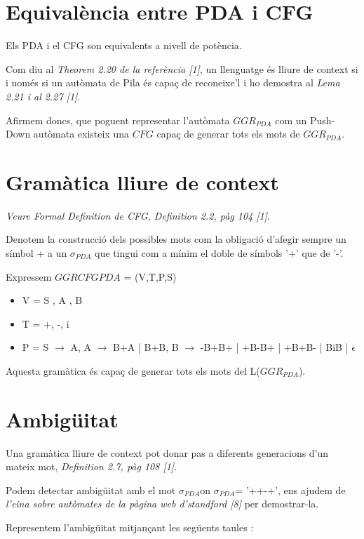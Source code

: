 \documentclass[12pt,a4paper]{report}
\def \wpda{$\sigma_{PDA} $}
\def \pdaCFG{$GGRCFG{PDA} $}
\def \pda{$GGR_{PDA} $}
\begin{document}
\section{Equivalència entre PDA i CFG}

Els PDA i el CFG son equivalents a nivell de potència. 

Com diu al \textit{Theorem 2.20 de la referència [1]}, un llenguatge és lliure de context si i només si un autòmata de Pila és capaç de reconeixe’l i ho demostra al \textit{Lema 2.21 i al 2.27 [1]}.

Afirmem doncs, que poguent representar l’autòmata \pda{} com un Push-Down autòmata existeix una $CFG$ capaç de generar tots els mots de \pda{}.

\section{Gramàtica lliure de context}

\textit{Veure Formal Definition de CFG, Definition 2.2, pàg 104 [1]}.

Denotem la construcció dels possibles mots com la obligació d’afegir sempre un símbol + a un \wpda{} que tingui com a mínim el doble de símbols '+' que de '-'.

Expressem \pdaCFG{} = (V,T,P,S)

\begin{itemize}
\item V  = {S , A , B}
\item T = {+, -, i }
\item P = {
		S $\rightarrow$ A,
		A $\rightarrow$ B+A | B+B,
		B $\rightarrow$ -B+B+ | +B-B+ | +B+B- | BiB | $\epsilon$
      }
\end{itemize}

Aquesta gramàtica és capaç de generar tots els mots del L(\pda{}).

\section{Ambigüitat}

Una gramàtica lliure de context pot donar pas a diferents generacions d’un mateix mot, \textit{Definition 2.7, pàg 108 [1]}. 

Podem detectar ambigüitat amb el mot \wpda on \wpda = '++-+', ens ajudem de \textit{l'eina sobre autòmates de la pàgina web d'standford [8]} per demostrar-la. 

Representem l'ambigüitat mitjançant les següents taules : 
\end{document}
